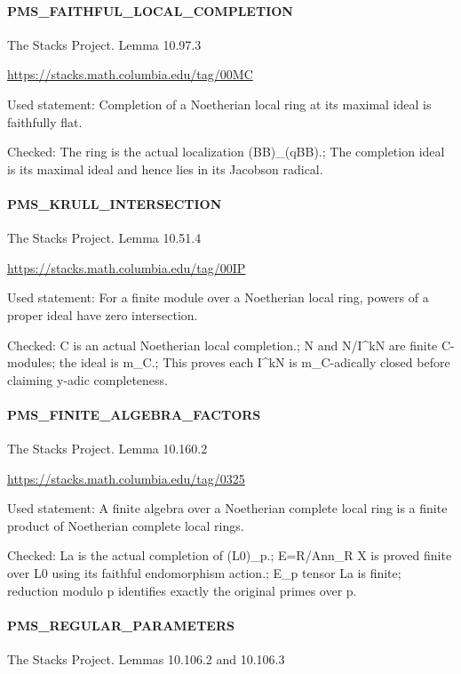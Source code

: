 \paragraph{PMS\_\allowbreak{}FAITHFUL\_\allowbreak{}LOCAL\_\allowbreak{}COMPLETION}The Stacks Project. Lemma 10.97.3

\url{https://stacks.math.columbia.edu/tag/00MC}

Used statement: Completion of a Noetherian local ring at its maximal ideal is faithfully flat.

Checked: The ring is the actual localization (BB)\_\allowbreak{}(qBB).; The completion ideal is its maximal ideal and hence lies in its Jacobson radical.

\paragraph{PMS\_\allowbreak{}KRULL\_\allowbreak{}INTERSECTION}The Stacks Project. Lemma 10.51.4

\url{https://stacks.math.columbia.edu/tag/00IP}

Used statement: For a finite module over a Noetherian local ring, powers of a proper ideal have zero intersection.

Checked: C is an actual Noetherian local completion.; N and N/\allowbreak{}I\textasciicircum{}kN are finite C-modules; the ideal is m\_\allowbreak{}C.; This proves each I\textasciicircum{}kN is m\_\allowbreak{}C-adically closed before claiming y-adic completeness.

\paragraph{PMS\_\allowbreak{}FINITE\_\allowbreak{}ALGEBRA\_\allowbreak{}FACTORS}The Stacks Project. Lemma 10.160.2

\url{https://stacks.math.columbia.edu/tag/0325}

Used statement: A finite algebra over a Noetherian complete local ring is a finite product of Noetherian complete local rings.

Checked: La is the actual completion of (L0)\_\allowbreak{}p.; E=R/\allowbreak{}Ann\_\allowbreak{}R X is proved finite over L0 using its faithful endomorphism action.; E\_\allowbreak{}p tensor La is finite; reduction modulo p identifies exactly the original primes over p.

\paragraph{PMS\_\allowbreak{}REGULAR\_\allowbreak{}PARAMETERS}The Stacks Project. Lemmas 10.106.2 and 10.106.3

